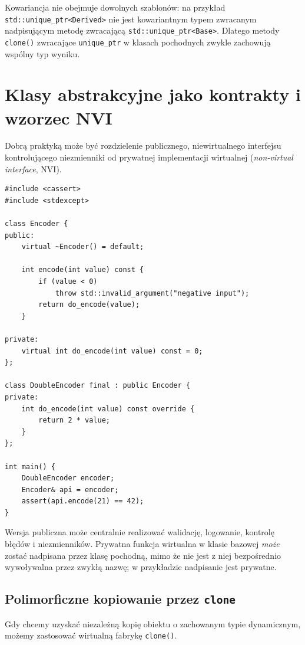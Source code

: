 \noindent Kowariancja nie obejmuje dowolnych szablonów: na przykład
\texttt{std::unique\_ptr<Derived>} nie jest kowariantnym typem zwracanym
nadpisującym metodę zwracającą \texttt{std::unique\_ptr<Base>}.
Dlatego metody \texttt{clone()} zwracające \texttt{unique\_ptr}
w klasach pochodnych zwykle zachowują wspólny typ wyniku.

\section{Klasy abstrakcyjne jako kontrakty i wzorzec NVI}
\label{sec:cpp12-nvi}

Dobrą praktyką może być rozdzielenie publicznego, niewirtualnego
interfejsu kontrolującego niezmienniki od prywatnej implementacji
wirtualnej (\emph{non-virtual interface}, NVI).

\begin{lstlisting}[caption={NVI: publiczny kontrakt i prywatna metoda wirtualna (C++11); kompletny program.}]
#include <cassert>
#include <stdexcept>

class Encoder {
public:
    virtual ~Encoder() = default;

    int encode(int value) const {
        if (value < 0)
            throw std::invalid_argument("negative input");
        return do_encode(value);
    }

private:
    virtual int do_encode(int value) const = 0;
};

class DoubleEncoder final : public Encoder {
private:
    int do_encode(int value) const override {
        return 2 * value;
    }
};

int main() {
    DoubleEncoder encoder;
    Encoder& api = encoder;
    assert(api.encode(21) == 42);
}
\end{lstlisting}

\noindent Wersja publiczna może centralnie realizować walidację,
logowanie, kontrolę błędów i niezmienników. Prywatna funkcja
wirtualna w klasie bazowej \emph{może} zostać nadpisana przez klasę
pochodną, mimo że nie jest z niej bezpośrednio wywoływalna
przez zwykłą nazwę; w przykładzie nadpisanie jest prywatne.

\subsection{Polimorficzne kopiowanie przez \texttt{clone}}

Gdy chcemy uzyskać niezależną kopię obiektu o zachowanym typie
dynamicznym, możemy zastosować wirtualną fabrykę \texttt{clone()}.

